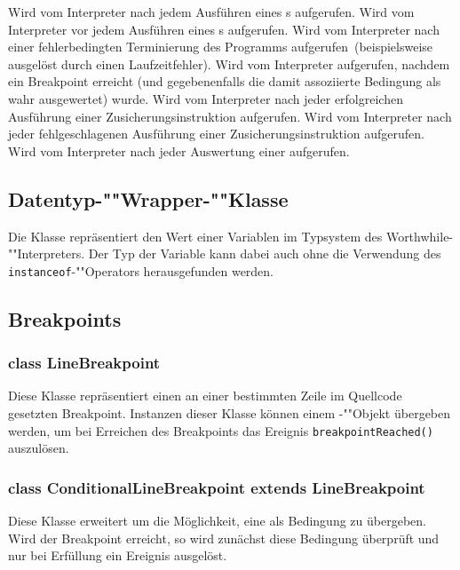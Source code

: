 \begin{description}
    Wird vom Interpreter nach jedem Ausführen eines s aufgerufen.
    Wird vom Interpreter vor jedem Ausführen eines s aufgerufen.
    Wird vom Interpreter nach einer fehlerbedingten Terminierung des Programms aufgerufen~(beispielsweise ausgelöst durch einen Laufzeitfehler).
    Wird vom Interpreter aufgerufen, nachdem ein Breakpoint erreicht (und gegebenenfalls die damit assoziierte Bedingung als wahr ausgewertet) wurde.
    Wird vom Interpreter nach jeder erfolgreichen Ausführung einer Zusicherungsinstruktion aufgerufen.
    Wird vom Interpreter nach jeder fehlgeschlagenen Ausführung einer Zusicherungsinstruktion aufgerufen.
    Wird vom Interpreter nach jeder Auswertung einer  aufgerufen.
\end{description}

\subsection{Datentyp-""Wrapper-""Klasse }
Die Klasse  repräsentiert den Wert einer Variablen im Typsystem des Worthwhile-""Interpreters. Der Typ der Variable kann dabei auch ohne die Verwendung des \texttt{instanceof}-""Operators herausgefunden werden.

\subsection{Breakpoints}
\subsubsection{class LineBreakpoint}
Diese Klasse repräsentiert einen an einer bestimmten Zeile im Quellcode gesetzten Breakpoint. Instanzen dieser Klasse können einem -""Objekt übergeben werden, um bei Erreichen des Breakpoints das Ereignis \texttt{breakpointReached()} auszulösen.

\subsubsection{class ConditionalLineBreakpoint extends LineBreakpoint}
Diese Klasse erweitert  um die Möglichkeit, eine  als Bedingung zu übergeben. Wird der Breakpoint erreicht, so wird zunächst diese Bedingung überprüft und nur bei Erfüllung ein Ereignis ausgelöst.

